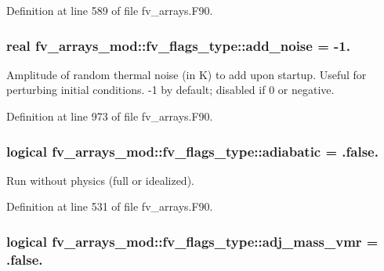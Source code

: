 Definition at line 589 of file fv\-\_\-arrays.\-F90.

\subsubsection[{add\-\_\-noise}]{\setlength{\rightskip}{0pt plus 5cm}real fv\-\_\-arrays\-\_\-mod\-::fv\-\_\-flags\-\_\-type\-::add\-\_\-noise = -\/1.}\label{structfv__arrays__mod_1_1fv__flags__type_ab60e81c0576720da7727e7fefc3c4ddd}


Amplitude of random thermal noise (in K) to add upon startup. Useful for perturbing initial conditions. -\/1 by default; disabled if 0 or negative. 



Definition at line 973 of file fv\-\_\-arrays.\-F90.

\subsubsection[{adiabatic}]{\setlength{\rightskip}{0pt plus 5cm}logical fv\-\_\-arrays\-\_\-mod\-::fv\-\_\-flags\-\_\-type\-::adiabatic = .false.}\label{structfv__arrays__mod_1_1fv__flags__type_a909f3113870ef34fea4078fbe8910676}


Run without physics (full or idealized). 



Definition at line 531 of file fv\-\_\-arrays.\-F90.

\subsubsection[{adj\-\_\-mass\-\_\-vmr}]{\setlength{\rightskip}{0pt plus 5cm}logical fv\-\_\-arrays\-\_\-mod\-::fv\-\_\-flags\-\_\-type\-::adj\-\_\-mass\-\_\-vmr = .false.}\label{structfv__arrays__mod_1_1fv__flags__type_a4042ed7bbea950c7af4a3efb709218e4}


